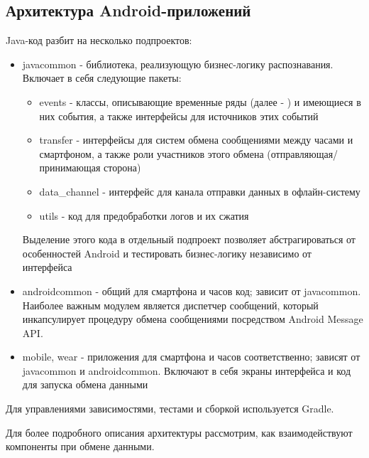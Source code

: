 \subsection{Архитектура Android-приложений}

Java-код разбит на несколько подпроектов:

\begin{itemize}
\item javacommon - библиотека, реализующую бизнес-логику распознавания. Включает в себя следующие пакеты:
  \begin{itemize}
  \item events - классы, описывающие временные ряды (далее - ) и имеющиеся в них события, а также интерфейсы для источников этих событий
  \item transfer - интерфейсы для систем обмена сообщениями между часами и смартфоном, а также роли участников этого обмена (отправляющая/принимающая сторона)
  \item data\_channel - интерфейс для канала отправки данных в офлайн-систему
  \item utils - код для предобработки логов и их сжатия
  \end{itemize}
Выделение этого кода в отдельный подпроект позволяет абстрагироваться от особенностей Android и тестировать бизнес-логику независимо от интерфейса
\item androidcommon - общий для смартфона и часов код; зависит от javacommon. Наиболее важным модулем является диспетчер сообщений, который инкапсулирует процедуру обмена сообщениями посредством Android Message API.
\item mobile, wear - приложения для смартфона и часов соответственно; зависят от javacommon и androidcommon. Включают в себя экраны интерфейса и код для запуска обмена данными
\end{itemize}

Для управлениями зависимостями, тестами и сборкой используется Gradle.

Для более подробного описания архитектуры рассмотрим, как взаимодействуют компоненты при обмене данными.

